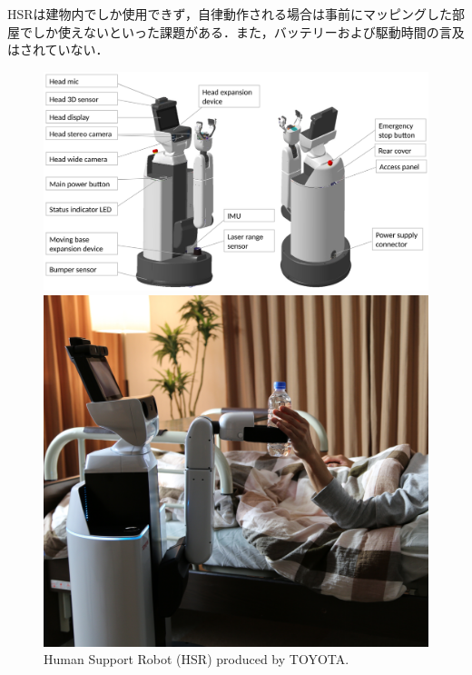 HSRは建物内でしか使用できず，自律動作される場合は事前にマッピングした部屋でしか使えないといった課題がある．また，バッテリーおよび駆動時間の言及はされていない．
\begin{figure}[H]
    \centering
    \begin{minipage}{0.6\hsize}
        \centering
        \includegraphics[width=\linewidth]{figure/chapter1/HSR_paper-2}
    \end{minipage}
    \begin{minipage}{0.39\hsize}
        \centering
        \includegraphics[width=\linewidth]{figure/chapter1/HSR_site-2}
    \end{minipage}
    \caption[Human Support Robot (HSR) produced by TOYOTA.]{Human Support Robot (HSR) produced by TOYOTA\cite{HSR2019, HSRサイト}.}
    \label{fig:HSR}
\end{figure}

